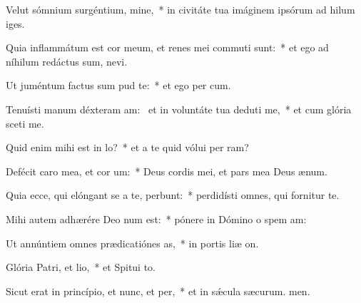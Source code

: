 \item Velut sómnium surgéntium, mine,~* in civitáte tua imáginem ipsórum ad hilum iges.
\item Quia inflammátum est cor meum, et renes mei commuti sunt:~* et ego ad níhilum redáctus sum,  nevi.
\item Ut juméntum factus sum pud te:~* et ego per cum.
\item Tenuísti manum déxteram am:~\pscross{} et in voluntáte tua deduti me,~* et cum glória sceti me.
\item Quid enim mihi est in lo?~* et a te quid vólui per ram?
\item Defécit caro mea, et cor um:~* Deus cordis mei, et pars mea Deus  ænum.
\item Quia ecce, qui elóngant se a te, perbunt:~* perdidísti omnes, qui fornitur  te.
\item Mihi autem adhærére Deo num est:~* pónere in Dómino o spem am:
\item Ut annúntiem omnes prædicatiónes as,~* in portis liæ on.
\item Glória Patri, et lio,~* et Spitui to.
\item Sicut erat in princípio, et nunc, et per,~* et in sǽcula sæcurum. men.
